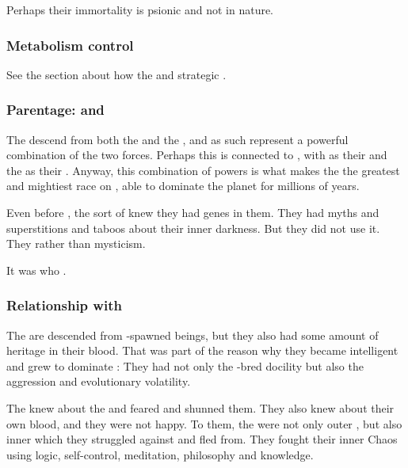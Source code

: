 Perhaps their immortality is psionic and not  in nature. 





\subsubsection{Metabolism control}
See the section about how the \ophidians {} and strategic . 





\subsubsection{Parentage: \Voyagers and \xss}
The \ophidians{} descend from both the \voyagers{} and the \xss, and as such represent a powerful combination of the two forces. 
Perhaps this is connected to , with \xsic{} \Chaos{} as their  and the \voyagers{} as their . 
Anyway, this combination of powers is what makes the \ophidians{} the greatest and mightiest race on \Miith{}, able to dominate the planet for millions of years. 

Even before \Sethicus, the \ophidians sort of knew they had \xs genes in them. 
They had myths and superstitions and taboos about their inner darkness. 
But they did not use it.
They  rather than mysticism. 

It was \Sethicus who . 





\subsubsection{Relationship with \XzaiShanns}
The \ophidians{} are descended from \voyager-spawned beings, but they also had some amount of \xsic{} heritage in their blood. 
That was part of the reason why they became intelligent and grew to dominate \Miith{}: 
They had not only the \voyager-bred docility but also the \xsic{} aggression and evolutionary volatility. 

The \ophidians{} knew about the \xss{} and feared and shunned them. 
They also knew about their own \xsic{} blood, and they were not happy. 
To them, the \xss{} were not only outer \daemons, but also inner \daemons{} which they struggled against and fled from. 
They fought their inner Chaos using logic, self-control, meditation, philosophy and knowledge. 


